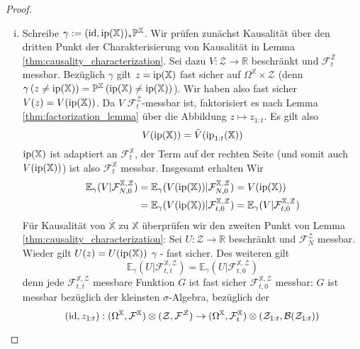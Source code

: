 \begin{proof}
\begin{enumerate}[(i)]
\item Schreibe $\gamma:=(\operatorname{id}, \operatorname{ip}(\mathbb{X}))_* \mathbb{P}^\mathbb{X}$. Wir prüfen zunächst Kausalität über den dritten Punkt der Charakterisierung von Kausalität in Lemma \ref{thm:causality_characterization}. Sei dazu $V: \mathcal{Z}\rightarrow\mathbb{R}$ beschränkt und $\mathcal{F}_t^\mathbb{Z}$ messbar. Bezüglich $\gamma$ gilt $z=\operatorname{ip}(\mathbb{X})$ fast sicher auf $\Omega^\mathbb{X} \times \mathcal{Z}$ (denn $\gamma\left(z \neq \operatorname{ip}(\mathbb{X})\right) = \mathbb{P}^\mathbb{X}\left(\operatorname{ip}(\mathbb{X}) \neq \operatorname{ip}(\mathbb{X})\right)$). Wir haben also fast sicher $V(z) = V(\operatorname{ip}(\mathbb{X}))$. Da $V$ $\mathcal{F}_t^\mathcal{Z}$-messbar ist, faktorisiert es nach Lemma \ref{thm:factorization_lemma} über die Abbildung $z \mapsto z_{1:t}$. Es gilt also
$$V(\operatorname{ip}(\mathbb{X})) = \tilde{V}(\operatorname{ip}_{1:t}(\mathbb{X}))$$
$\operatorname{ip}(\mathbb{X})$ ist adaptiert an $\mathcal{F}_t^\mathbb{X}$, der Term auf der rechten Seite (und somit auch $V(\operatorname{ip}(\mathbb{X}))$) ist also $\mathcal{F}_t^\mathbb{X}$ messbar. Insgesamt erhalten Wir
\begin{align*}
    \mathbb{E}_\gamma(V \vert \mathcal{F}_{N, 0}^{\mathbb{X}, \mathcal{Z}}) &= \mathbb{E}_\gamma(V(\operatorname{ip}(\mathbb{X}))\vert \mathcal{F}_{N, 0}^{\mathbb{X}, \mathcal{Z}}) = V(\operatorname{ip}(\mathbb{X})) \\
    &= \mathbb{E}_\gamma(V(\operatorname{ip}(\mathbb{X})) \vert \mathcal{F}_{t, 0}^{\mathbb{X}, \mathcal{Z}}) = \mathbb{E}_\gamma(V \vert \mathcal{F}_{t, 0}^{\mathbb{X}, \mathcal{Z}})
\end{align*}
Für Kausalität von $\overline{\mathbb{X}}$ zu $\mathbb{X}$ überprüfen wir den zweiten Punkt von Lemma \ref{thm:causality_characterization}: Sei $U: \mathcal{Z}\rightarrow \mathbb{R}$ beschränkt und $\mathcal{F}_N^\mathcal{Z}$ messbar. Wieder gilt $U(z) = U(\operatorname{ip}(\mathbb{X}))$ $\gamma$ - fast sicher. Des weiteren gilt
\begin{equation}\label{eq:39i_1}
\mathbb{E}_\gamma(U \vert \mathcal{F}_{t,t}^{\mathbb{X}, \mathcal{Z}}) = \mathbb{E}_\gamma(U \vert \mathcal{F}_{t, 0}^{\mathbb{X}, \mathcal{Z}})
\end{equation}
denn jede $\mathcal{F}_{t,t}^{\mathbb{X}, \mathcal{Z}}$ messbare Funktion $G$ ist fast sicher $\mathcal{F}_{t, 0}^{\mathbb{X}, \mathcal{Z}}$ messbar: $G$ ist messbar bezüglich der kleinsten $\sigma$-Algebra, bezüglich der 
$$(\operatorname{id}, z_{1:t}): (\Omega^\mathbb{X}, \mathcal{F}^\mathbb{X})\otimes (\mathcal{Z}, \mathcal{F}^{\mathcal{Z}}) \rightarrow (\Omega^\mathbb{X}, \mathcal{F}_t^\mathbb{X}) \otimes (\mathcal{Z}_{1:t}, \mathcal{B}(\mathcal{Z}_{1:t}))$$

\end{enumerate}
\end{proof}
